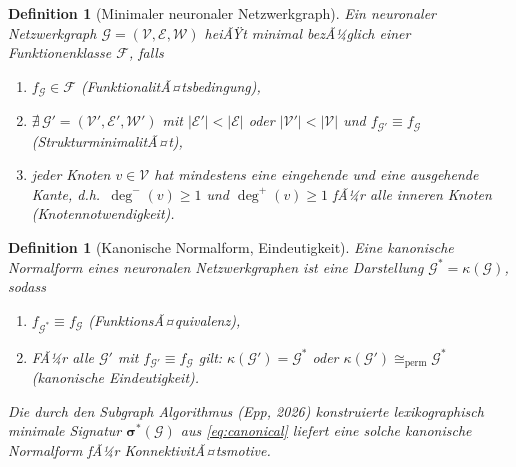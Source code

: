 ﻿\documentclass[12pt, a4paper, openany]{report}
\newtheorem{definition}[theorem]{Definition}
\newcommand{\calG}{\mathcal{G}}
\newcommand{\calV}{\mathcal{V}}
\newcommand{\calE}{\mathcal{E}}
\newcommand{\calW}{\mathcal{W}}
\newcommand{\calF}{\mathcal{F}}
\begin{document}
\begin{definition}[Minimaler neuronaler Netzwerkgraph]
\label{def:minimal_nngraph}
Ein neuronaler Netzwerkgraph $\calG = (\calV, \calE, \calW)$ heiÃŸt
\emph{minimal} bezÃ¼glich einer Funktionenklasse $\calF$, falls
\begin{enumerate}[label=(\roman*)]
  \item $f_\calG \in \calF$ (FunktionalitÃ¤tsbedingung),
  \item $\nexists\, \calG' = (\calV', \calE', \calW')$ mit
        $|\calE'| < |\calE|$ oder $|\calV'| < |\calV|$ und
        $f_{\calG'} \equiv f_\calG$ (StrukturminimalitÃ¤t),
  \item jeder Knoten $v \in \calV$ hat mindestens eine eingehende und eine
        ausgehende Kante, d.h.\ $\deg^-(v) \geq 1$ und $\deg^+(v) \geq 1$
        fÃ¼r alle inneren Knoten (Knotennotwendigkeit).
\end{enumerate}
\end{definition}

\begin{definition}[Kanonische Normalform, Eindeutigkeit]
\label{def:canonical_normal_form}
Eine \emph{kanonische Normalform} eines neuronalen Netzwerkgraphen ist eine
Darstellung $\calG^* = \kappa(\calG)$, sodass
\begin{enumerate}[label=(\roman*)]
  \item $f_{\calG^*} \equiv f_\calG$ (FunktionsÃ¤quivalenz),
  \item FÃ¼r alle $\calG'$ mit $f_{\calG'} \equiv f_\calG$ gilt:
        $\kappa(\calG') = \calG^*$ oder $\kappa(\calG') \cong_{\mathrm{perm}} \calG^*$
        (kanonische Eindeutigkeit).
\end{enumerate}
Die durch den Subgraph Algorithmus (Epp, 2026) konstruierte \emph{lexikographisch
minimale Signatur} $\bm{\sigma}^*(\calG)$ aus \eqref{eq:canonical} liefert
eine solche kanonische Normalform fÃ¼r KonnektivitÃ¤tsmotive.
\end{definition}
\end{document}

